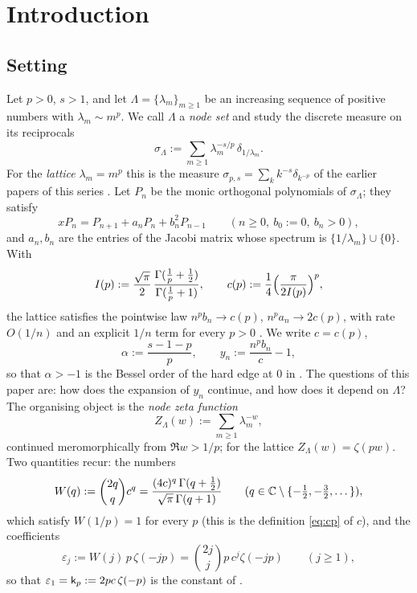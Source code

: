 \section{Introduction}\label{sec:intro}

\subsection{Setting}\label{sec:setting}
Let $p>0$, $s>1$, and let $\Lambda=\{\lambda_m\}_{m\ge1}$ be an increasing sequence of positive numbers with
$\lambda_m\sim m^p$. We call $\Lambda$ a \emph{node set} and study the discrete measure on its reciprocals
\begin{equation}\label{eq:sigmaL}
  \sigma_\Lambda:=\sum_{m\ge1}\lambda_m^{-s/p}\,\delta_{1/\lambda_m}.
\end{equation}
For the \emph{lattice} $\lambda_m=m^p$ this is the measure $\sigma_{p,s}=\sum_kk^{-s}\delta_{k^{-p}}$ of the earlier
papers of this series \cite{PaperI,PaperII,Paper3}. Let $P_n$ be the monic orthogonal polynomials of $\sigma_\Lambda$;
they satisfy
\begin{equation}\label{eq:rec}
  xP_n=P_{n+1}+a_nP_n+b_n^2P_{n-1}\qquad(n\ge0,\ b_0:=0,\ b_n>0),
\end{equation}
and $a_n,b_n$ are the entries of the Jacobi matrix whose spectrum is $\{1/\lambda_m\}\cup\{0\}$. With
\begin{equation}\label{eq:cp}
  I(p):=\frac{\sqrt\pi}{2}\,\frac{\Gamma(\frac1p+\frac12)}{\Gamma(\frac1p+1)},\qquad
  c(p):=\frac14\Bigl(\frac{\pi}{2I(p)}\Bigr)^{p},
\end{equation}
the lattice satisfies the pointwise law $n^pb_n\to c(p)$, $n^pa_n\to2c(p)$, with rate $O(1/n)$ and an explicit $1/n$
term for every $p>0$ \cite[Theorems~1.2 and~1.4]{PaperII}. We write $c=c(p)$,
\begin{equation}\label{eq:alpha-y}
  \alpha:=\frac{s-1-p}{p},\qquad y_n:=\frac{n^pb_n}{c}-1,
\end{equation}
so that $\alpha>-1$ is the Bessel order of the hard edge at $0$ in \cite{PaperII}. The questions of this paper are:
how does the expansion of $y_n$ continue, and how does it depend on $\Lambda$? The organising object is the
\emph{node zeta function}
\begin{equation}\label{eq:Z}
  Z_\Lambda(w):=\sum_{m\ge1}\lambda_m^{-w},
\end{equation}
continued meromorphically from $\Re w>1/p$; for the lattice $Z_\Lambda(w)=\zeta(pw)$. Two quantities recur: the
numbers
\begin{equation}\label{eq:W}
  W(q):=\binom{2q}{q}c^q=\frac{(4c)^q\,\Gamma(q+\frac12)}{\sqrt\pi\,\Gamma(q+1)}\qquad(q\in\mathbb{C}\setminus\{-\tfrac12,-\tfrac32,\dots\}),
\end{equation}
which satisfy $W(1/p)=1$ for every $p$ (this is the definition \eqref{eq:cp} of $c$), and the coefficients
\begin{equation}\label{eq:epsj}
  \varepsilon_j:=W(j)\,p\,\zeta(-jp)=\binom{2j}{j}p\,c^j\zeta(-jp)\qquad(j\ge1),
\end{equation}
so that $\varepsilon_1=\mathsf k_p:=2pc\,\zeta(-p)$ is the constant of \cite[Theorem~1.4(ii)]{PaperII}.

